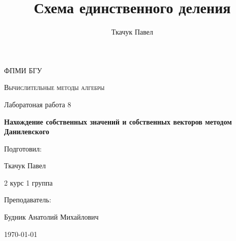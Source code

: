 \documentclass[11.4pt]{article}
\author{Ткачук Павел}
\title{Схема единственного деления}
\begin{document}
	\begin{titlepage}
		
		\centering
		{\scshape\LARGE ФПМИ БГУ \par}
		\vfill
		\begin{flushleft}
		{\scshape\Large Вычислительные методы алгебры\par Лаборатоная работа 8 \par}
		\vspace{1cm}
		{\huge\bfseries Нахождение собственных значений и собственных векторов методом Данилевского\par}
		\end{flushleft}
		\vspace{10cm}
		\begin{flushright}
		\large
		Подготовил:\par
		Ткачук Павел\par
		2 курс 1 группа\par
		\vspace{0.5cm}
		Преподаватель:\par
		Будник Анатолий Михайлович
		\end{flushright}
		
		\vfill
		{\large \today}
	\end{titlepage}
\end{document}
